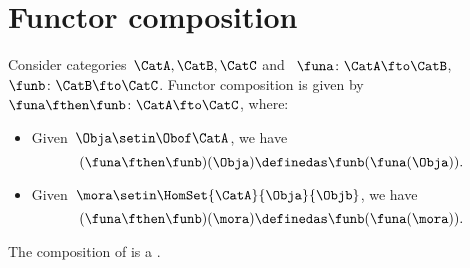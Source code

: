 
\section{Functor composition}
\begin{ctdefinition}
    \label{def:functor_composition}
    Consider categories~$\CatA,\CatB,\CatC$ and ~$\funa\colon \CatA\fto \CatB$,~$\funb \colon \CatB\fto \CatC$.
    Functor composition is given by~$\funa\fthen \funb\colon \CatA \fto \CatC$, where:
    \begin{itemize}
        \item Given~$\Obja\setin \Obof\CatA$, we have
              \begin{equation}
                  (\funa\fthen \funb)(\Obja)
                  \definedas\funb(\funa(\Obja)).
              \end{equation}
        \item Given~$\mora \setin \HomSet{\CatA}{\Obja}{\Objb}$, we have
              \begin{equation}
                  (\funa\fthen \funb)(\mora)
                  \definedas \funb(\funa(\mora)).
              \end{equation}
    \end{itemize}
\end{ctdefinition}

\begin{lemma}
    \label{lem:functors_compose}
    The composition of  is a .
\end{lemma}

